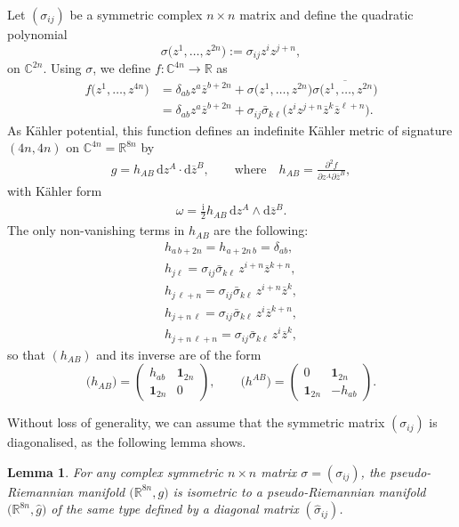 \documentclass[11pt]{article}
\numberwithin{equation}{section}
\numberwithin{equation}{section}
\newtheorem{Lemma}[Theorem]{Lemma}
\newcommand{\C}{\ensuremath{\mathbb{C}}}
\newcommand{\1}{\mathbf{1}}
\renewcommand{\d}{{\mathrm d}}
\newcommand{\ol}{\overline}
\newcommand{\rr}{\mathbb{R}}
\newcommand{\+}{\oplus}
\renewcommand{\=}{\equiv}
\newcommand{\R}{\mathbb{R}}
\begin{document}
Let $(\sigma_{ij})$ be a symmetric complex $n\times n$ matrix and define the quadratic polynomial
\[\sigma\bigl(z^1,\ldots, z^{2n}\bigr):= \sigma_{ij}z^{i}z^{j+n},\]
on $\C^{2n}$.
Using $\sigma$, we define
 $f \colon \C^{4n}\to \rr$ as
\begin{align}
f\bigl(z^1,\ldots , z^{4n}\bigr)
&{}=
\delta_{ab} z^a\ol{z}^{b+2n}+
\sigma\bigl(z^1,\ldots, z^{2n}\bigr)\overline{\sigma\bigl(z^1,\ldots, z^{2n}\bigr)}
\nonumber\\
&{}=
\delta_{ab} z^a\ol{z}^{b+2n}
+
\sigma_{ij}\bar{\sigma}_{k\ell}\bigl(
 z^{i}z^{j+n}\ol{z}^{k} \ol{z}^{\ell+n}\bigr).\label{potential}
\end{align}
As K\"{a}hler potential, this function defines an indefinite K\"ahler metric of signature $(4n,4n)$ on $\C^{4n}=\rr^{8n}$ by
\begin{gather}\label{metric}
g= h_{AB} \,
 \d z^A \cdot \d \ol{z}^B,\qquad \text{where} \quad h_{AB}=\frac{\partial^2 f}{\partial z^A\partial \ol{z}^B},
 \end{gather}
with K\"{a}hler form
 \begin{align*}
\omega
=
\frac{\mathrm{i}}{2} h_{AB}\,
 \d z^A \wedge \d \ol{z}^B.
\end{align*}
The only non-vanishing terms in $h_{AB}$ are the following:
\begin{gather}
h_{a\, b+2n} = h_{a+2n\, b} = \delta_{ab},
\nonumber\\
h_{j\ell} =
\sigma_{ij}\bar{\sigma}_{k\ell}\,
 z^{i+n}\ol{z}^{k+n},
\nonumber\\
h_{j\, \ell+n} =
\sigma_{ij}\bar{\sigma}_{k\ell}\,
 z^{i+n}\ol{z}^{k},
\nonumber\\
h_{j+n\,\ell} =
\sigma_{ij}\bar{\sigma}_{k\ell}\,
 z^{i}\ol{z}^{k+n},
\nonumber\\
h_{j+n\, \ell+n} =
\sigma_{ij}\bar{\sigma}_{k\ell}\,
 z^{i}\ol{z}^{k},
\label{metriccoeff}
\end{gather}
so that {$(h_{AB})$} and its inverse are of the form
\[
{\bigl(h_{AB}\bigr)}=\begin{pmatrix} h_{ab} &\1_{2n} \\ \1_{2n} & 0\end{pmatrix},
\qquad
{\bigl(h^{AB}\bigr)}=\begin{pmatrix} 0 &\1_{2n} \\ \1_{2n} & -h_{ab}\end{pmatrix}.
\]

Without loss of generality, we can assume that the symmetric matrix {$(\sigma_{ij})$} is diagonalised, as the following lemma shows.
\begin{Lemma}\label{diag:lem}
For any complex symmetric $n\times n$ matrix $\sigma=(\sigma_{ij})$, the pseudo-Riemannian manifold $\bigl(\R^{8n},g\bigr)$ is isometric to a pseudo-Riemannian manifold $\bigl(\R^{8n},\hat g\bigr)$ of the same type defined by a diagonal matrix $(\hat\sigma_{ij})$.
\end{Lemma}
\end{document}
